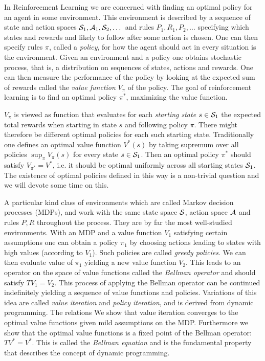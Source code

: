 In Reinforcement Learning
we are concerned with finding an optimal policy
for an agent in some environment.
This environment is described by
a sequence of state and action spaces
$\mathcal{S}_1, \mathcal{A}_1, \mathcal{S}_2, \dots$
and rules $P_1, R_1, P_2, \dots$ specifying which states and rewards
and likely to follow after some action is chosen.
One can then specify rules $\pi$, called a \emph{policy},
for how the agent should act in every situation is the environment.
Given an environment and a policy one obtains stochastic process,
that is, a distribution on sequences of states, actions and
rewards.
One can then measure the performance of the policy by looking at
the expected sum of rewards called the \emph{value function}
$V_\pi$ of the policy.
The goal of reinforcement learning is to find an optimal policy $\pi^*$,
maximizing the value function.

$V_\pi$ is viewed as function that evaluates for each \emph{starting state}
$s \in \mathcal{S}_1$ the expected total rewards when starting in state $s$
and following policy $\pi$.
There might therefore be different optimal policies for each such starting
state.
Traditionally one defines an optimal value function $V^*(s)$
by taking supremum over all policies $\sup_\pi V_\pi(s)$ for every state
$s \in \mathcal{S}_1$.
Then an optimal policy $\pi^*$ should satisfy $V_{\pi^*} = V^*$,
i.e. it should be optimal uniformly across all starting states $\mathcal{S}_1$.
The existence of optimal policies defined in this way is a non-trivial
question and we will devote some time on this.

A particular kind class of environments which are called Markov decision processes
(MDPs),
and work with the same state space $\mathcal{S}$, action space $\mathcal{A}$ and rules
$P, R$ throughout the process.
They are by far the most well-studied environments.
With an MDP and a value function $V_1$ satisfying certain assumptions 
one can obtain a policy $\pi_1$ by choosing actions
leading to states with high values (according to $V_1$).
Such policies are called \emph{greedy policies}.
We can then evaluate value of $\pi_1$ yielding a new value function $V_2$.
This leads to an operator on the space of value functions called the
\emph{Bellman operator} and should satisfy $TV_1 = V_2$.
This process of applying the Bellman operator
can be continued indefinitely yielding a sequence of value
functions and policies.
Variations of this idea are called \emph{value iteration} and
\emph{policy iteration},
and is derived from dynamic programming.
The relations 
We show that value iteration converges to the optimal value functions
given mild assumptions on the MDP.
Furthermore we show that the optimal value functions is a fixed point
of the Bellman operator: $TV^* = V^*$.
This is called the \emph{Bellman equation} and is the fundamental property
that describes the concept of dynamic programming.

